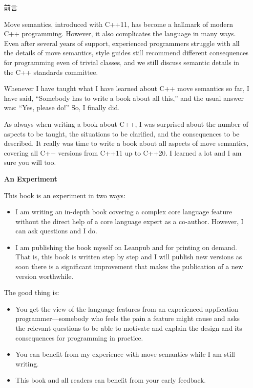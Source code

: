 \begin{flushright}
	 前言
\end{flushright}

Move semantics, introduced with C++11, has become a hallmark of modern C++ programming. However, it also complicates the language in many ways. Even after several years of support, experienced programmers struggle with all the details of move semantics, style guides still recommend different consequences for programming even of trivial classes, and we still discuss semantic details in the C++ standards committee.\par

Whenever I have taught what I have learned about C++ move semantics so far, I have said, “Somebody has to write a book about all this,” and the usual answer was: “Yes, please do!” So, I finally did.\par

As always when writing a book about C++, I was surprised about the number of aspects to be taught, the situations to be clarified, and the consequences to be described. It really was time to write a book about all aspects of move semantics, covering all C++ versions from C++11 up to C++20. I learned a lot and I am sure you will too. \par

\hspace*{\fill} \par %
\textbf{An Experiment}

This book is an experiment in two ways:\par
\begin{itemize}
	\item I am writing an in-depth book covering a complex core language feature without the direct help of a core language expert as a co-author. However, I can ask questions and I do.
	\item I am publishing the book myself on Leanpub and for printing on demand. That is, this book is written step by step and I will publish new versions as soon there is a significant improvement that makes the publication of a new version worthwhile.
\end{itemize}

The good thing is:\par
\begin{itemize}
	\item You get the view of the language features from an experienced application programmer—somebody who feels the pain a feature might cause and asks the relevant questions to be able to motivate and explain the	design and its consequences for programming in practice.
	\item You can benefit from my experience with move semantics while I am still writing.
	\item This book and all readers can benefit from your early feedback.
\end{itemize}

